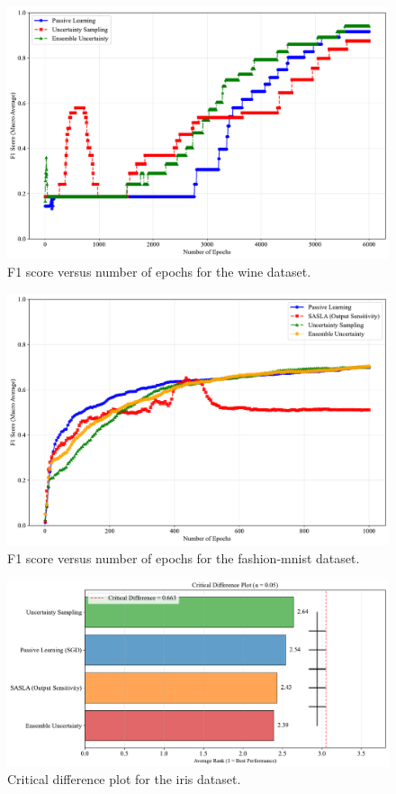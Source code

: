 \documentclass[10pt, conference]{IEEEtran}
\begin{document}
\begin{figure}[!t]
	\centering
	\includegraphics[width=\linewidth]{../results/wine/f1_score_vs_epochs.pdf}
	\caption{F1 score versus number of epochs for the wine dataset.}
	\label{fig:f1_wine}
\end{figure}

\begin{figure}[!t]
	\centering
	\includegraphics[width=\linewidth]{../results/fashion/f1_score_vs_epochs.pdf}
	\caption{F1 score versus number of epochs for the fashion-mnist dataset.}
	\label{fig:f1_fashion}
\end{figure}

\begin{figure}[!t]
	\centering
	\includegraphics[width=\linewidth]{../results/iris/critical_difference_plot.pdf}
	\caption{Critical difference plot for the iris dataset.}
	\label{fig:cd_iris}
\end{figure}
\end{document}
